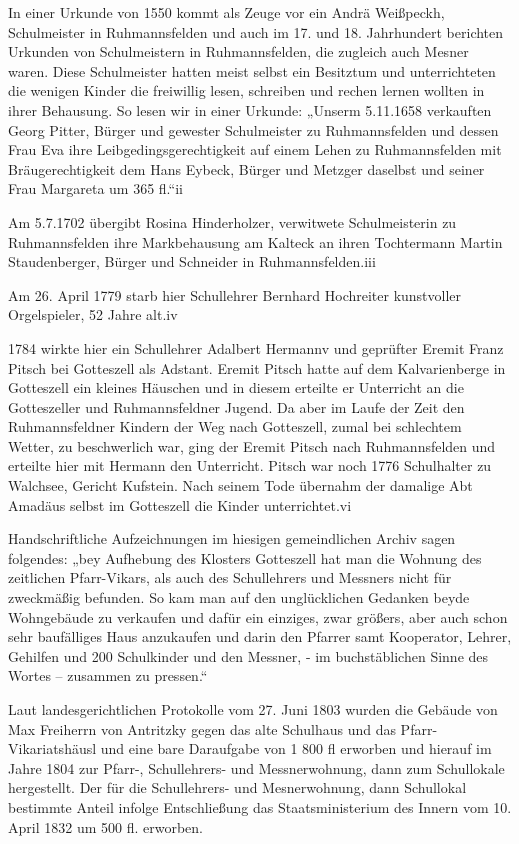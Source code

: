 \documentclass[12pt,a4paper]{book}
\begin{document}
In einer Urkunde von 1550 kommt als Zeuge vor ein Andrä Weißpeckh, Schulmeister
in Ruhmannsfelden und auch im 17. und 18. Jahrhundert berichten Urkunden von
Schulmeistern in Ruhmannsfelden, die zugleich auch Mesner waren. Diese
Schulmeister hatten meist selbst ein Besitztum und unterrichteten die wenigen
Kinder die freiwillig lesen, schreiben und rechen lernen wollten in ihrer
Behausung. So lesen wir in einer Urkunde: „Unserm 5.11.1658 verkauften Georg
Pitter, Bürger und gewester Schulmeister zu Ruhmannsfelden und dessen Frau Eva
ihre Leibgedingsgerechtigkeit auf einem Lehen zu Ruhmannsfelden mit
Bräugerechtigkeit dem Hans Eybeck, Bürger und Metzger daselbst und seiner Frau
Margareta um 365 fl.“ii

Am 5.7.1702 übergibt Rosina Hinderholzer, verwitwete Schulmeisterin zu
Ruhmannsfelden ihre Markbehausung am Kalteck an ihren Tochtermann Martin
Staudenberger, Bürger und Schneider in Ruhmannsfelden.iii

Am 26. April 1779 starb hier Schullehrer Bernhard Hochreiter kunstvoller
Orgelspieler, 52 Jahre alt.iv

1784 wirkte hier ein Schullehrer Adalbert Hermannv und geprüfter Eremit Franz
Pitsch bei Gotteszell als Adstant. Eremit Pitsch hatte auf dem Kalvarienberge in
Gotteszell ein kleines Häuschen und in diesem erteilte er Unterricht an die
Gotteszeller und Ruhmannsfeldner Jugend. Da aber im Laufe der Zeit den
Ruhmannsfeldner Kindern der Weg nach Gotteszell, zumal bei schlechtem Wetter, zu
beschwerlich war, ging der Eremit Pitsch nach Ruhmannsfelden und erteilte hier
mit Hermann den Unterricht. Pitsch war noch 1776 Schulhalter zu Walchsee,
Gericht Kufstein. Nach seinem Tode übernahm der damalige Abt Amadäus selbst im
Gotteszell die Kinder unterrichtet.vi

Handschriftliche Aufzeichnungen im hiesigen gemeindlichen Archiv sagen
folgendes: „bey Aufhebung des Klosters Gotteszell hat man die Wohnung des
zeitlichen Pfarr-Vikars, als auch des Schullehrers und Messners nicht für
zweckmäßig befunden. So kam man auf den unglücklichen Gedanken beyde Wohngebäude
zu verkaufen und dafür ein einziges, zwar größers, aber auch schon sehr
baufälliges Haus anzukaufen und darin den Pfarrer samt Kooperator, Lehrer,
Gehilfen und 200 Schulkinder und den Messner, - im buchstäblichen Sinne des
Wortes – zusammen zu pressen.“

Laut landesgerichtlichen Protokolle vom 27. Juni 1803 wurden die Gebäude von Max
Freiherrn von Antritzky gegen das alte Schulhaus und das Pfarr-Vikariatshäusl
und eine bare Daraufgabe von 1 800 fl erworben und hierauf im Jahre 1804 zur
Pfarr-, Schullehrers- und Messnerwohnung, dann zum Schullokale hergestellt. Der
für die Schullehrers- und Mesnerwohnung, dann Schullokal bestimmte Anteil
infolge Entschließung das Staatsministerium des Innern vom 10. April 1832 um 500
fl. erworben.
\end{document}
